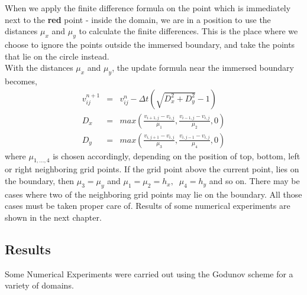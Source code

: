 	\noindent
	When we apply the finite difference formula on the point which is immediately next to the \textbf{red} point - inside the domain, we are in a position to use the distances $\mu_x$ and $\mu_y$ to calculate the finite differences. This is the place where we choose to ignore the points outside the immersed boundary, and take the points that lie on the circle instead.\\
	
	\noindent
	With the distances $\mu_x$ and $\mu_y$, the update formula near the immersed boundary becomes,
	\begin{eqnarray}
	v_{ij}^{n+1} &=& v_{ij}^n - \Delta t\left(\sqrt{D_x^2 + D_y^2}-1\right)\\ 
	D_x &=& max\left(\frac{v_{i+1,j}-v_{i,j}}{\mu_1},\frac{v_{i-1,j}-v_{i,j}}{\mu_2},0\right)\\
	D_y &=& max\left(\frac{v_{i,j+1}-v_{i,j}}{\mu_3},\frac{v_{i,j-1}-v_{i,j}}{\mu_4},0\right)
	\end{eqnarray}
	where $\mu_{1,\dots,4}$ is chosen accordingly, depending on the position of top, bottom, left or right neighboring grid points. If the grid point above the current point, lies on the boundary, then $\mu_3 = \mu_y$ and $\mu_1 =  \mu_2 = h_x, \;\; \mu_4 = h_y$ and so on. There may be cases where two of the neighboring grid points may lie on the boundary. All those cases must be taken proper care of. Results of some numerical experiments are shown in the next chapter.
	
	\subsection{Results}
	Some Numerical Experiments were carried out using the Godunov scheme for a variety of domains.\\
			
